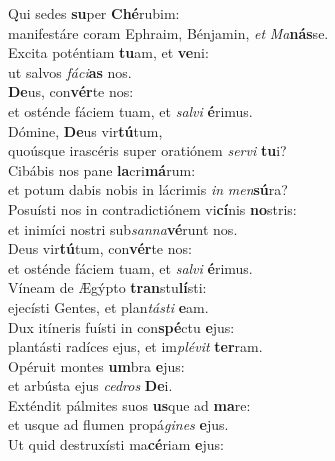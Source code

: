 \evenverse Qui sedes \textbf{su}per \textbf{Ché}rubim:~\*\\
\evenverse manifestáre coram Ephraim, Bénjamin, \textit{et} \textit{Ma}\textbf{nás}se.\\
\oddverse Excita poténtiam \textbf{tu}am, et \textbf{ve}ni:~\*\\
\oddverse ut salvos \textit{fá}\textit{ci}\textbf{as} nos.\\
\evenverse \textbf{De}us, con\textbf{vér}te nos:~\*\\
\evenverse et osténde fáciem tuam, et \textit{sal}\textit{vi} \textbf{é}rimus.\\
\oddverse Dómine, \textbf{De}us vir\textbf{tú}tum,~\*\\
\oddverse quoúsque irascéris super oratiónem \textit{ser}\textit{vi} \textbf{tu}i?\\
\evenverse Cibábis nos pane \textbf{la}cri\textbf{má}rum:~\*\\
\evenverse et potum dabis nobis in lácrimis \textit{in} \textit{men}\textbf{sú}ra?\\
\oddverse Posuísti nos in contradictiónem vi\textbf{cí}nis \textbf{no}stris:~\*\\
\oddverse et inimíci nostri sub\textit{san}\textit{na}\textbf{vé}runt nos.\\
\evenverse Deus vir\textbf{tú}tum, con\textbf{vér}te nos:~\*\\
\evenverse et osténde fáciem tuam, et \textit{sal}\textit{vi} \textbf{é}rimus.\\
\oddverse Víneam de Ægýpto \textbf{tran}stu\textbf{lí}sti:~\*\\
\oddverse ejecísti Gentes, et plan\textit{tá}\textit{sti} \textbf{e}am.\\
\evenverse Dux itíneris fuísti in con\textbf{spé}ctu \textbf{e}jus:~\*\\
\evenverse plantásti radíces ejus, et im\textit{plé}\textit{vit} \textbf{ter}ram.\\
\oddverse Opéruit montes \textbf{um}bra \textbf{e}jus:~\*\\
\oddverse et arbústa ejus \textit{ce}\textit{dros} \textbf{De}i.\\
\evenverse Exténdit pálmites suos \textbf{us}que ad \textbf{ma}re:~\*\\
\evenverse et usque ad flumen propá\textit{gi}\textit{nes} \textbf{e}jus.\\
\oddverse Ut quid destruxísti ma\textbf{cé}riam \textbf{e}jus:~\*\\
